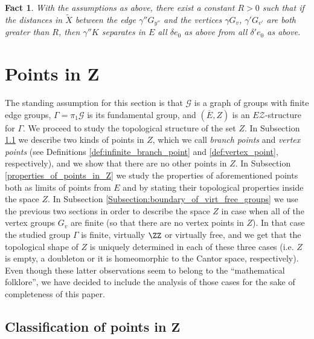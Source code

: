 \documentclass[12pt, a4paper]{article}
\newcommand{\8}{\infty}
\theoremstyle{break}
\newtheorem{fact}[thm]{Fact}
\theoremstyle{defbreak}
\newcommand{\ol}[1]{\overline{#1}}
\newcommand{\wtl}[1]{\widetilde{#1}}
\begin{document}
\medskip

\begin{fact}\label{fact:sufficiently_far_vertices}
With the assumptions as above, there exist a constant $R>0$ such that if the distances 
in $\wtl{X}$ between the edge $\gamma''G_{y''}$ and the vertices $\gamma G_v$, $\gamma'G_{v'}$ are both greater than $R$, then $\gamma''K$ separates in $E$ all $\delta e_0$ as above from all $\delta'e_0$ as above.
\end{fact}




\section{Points in \texorpdfstring{$\mathbf{Z}$}{Z}}\label{Section:classification_of_points}

The standing assumption for this section is that $\mathcal{G}$
is a graph of groups with finite edge groups, 
$\Gamma=\pi_1\mathcal{G}$ is its fundamental group,
and  $(\ol{E},Z)$ is an $E\mathcal{Z}$-structure for $\Gamma$.
We proceed to study the topological structure of the set $Z$.
In Subsection \ref{Subsection:categorisation_of_points}
we describe two kinds of points 
in $Z$, which we call {\it branch points} and {\it vertex points} (see Definitions \ref{def:infinite_branch_point} and \ref{def:vertex_point}, respectively), and we show that there are no other points in $Z$. In Subsection \ref{properties_of_points_in_Z} we study the properties of aforementioned points both as limits of points from $E$ and by stating their topological properties inside the space $Z$. In Subsection \ref{Subsection:boundary_of_virt_free_groups} we use the previous two sections in order to describe the space $Z$ in case when all of the vertex groups $G_v$ are finite (so that there are no vertex points in $Z$). In that case the studied group $\Gamma$ is finite, virtually $\ZZ$ or virtually free,
and we get that the topological shape of $Z$ is uniquely determined in each of these three cases (i.e. $Z$ is empty,
a doubleton or it is homeomorphic to the Cantor space, respectively). Even though these latter observations seem to belong to the ``mathematical folklore'', we have decided to include the analysis of those cases for the sake of completeness of this paper.



\subsection{Classification of points in \texorpdfstring{$\mathbf{Z}$}{Z}}\label{Subsection:categorisation_of_points}
\end{document}
